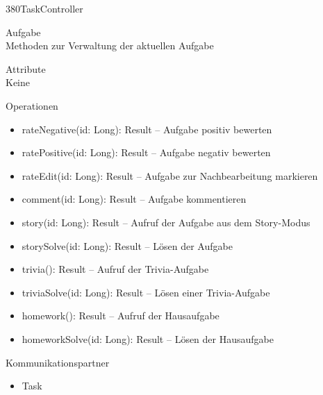 \newpage
\begin{class}{380}{TaskController}
\item[Aufgabe]~\\
Methoden zur Verwaltung der aktuellen Aufgabe
\item[Attribute]~\\
Keine
\item[Operationen]~\\
\begin{itemize}
\item rateNegative(id: Long): Result -- Aufgabe positiv bewerten
\item ratePositive(id: Long): Result -- Aufgabe negativ bewerten
\item rateEdit(id: Long): Result -- Aufgabe zur Nachbearbeitung markieren
\item comment(id: Long): Result -- Aufgabe kommentieren
\item story(id: Long): Result -- Aufruf der Aufgabe aus dem Story-Modus
\item storySolve(id: Long): Result -- Lösen der Aufgabe
\item trivia(): Result -- Aufruf der Trivia-Aufgabe
\item triviaSolve(id: Long): Result -- Lösen einer Trivia-Aufgabe
\item homework(): Result -- Aufruf der Hausaufgabe
\item homeworkSolve(id: Long): Result -- Lösen der Hausaufgabe
\end{itemize}
\item[Kommunikationspartner]~\\
\begin{itemize}
\item Task
\end{itemize}
\end{class}
